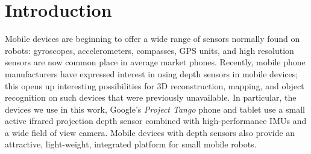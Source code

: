 \documentclass[conference,10pt]{IEEEtran}
\begin{document}
\section{Introduction}

Mobile devices are beginning to offer a wide range of sensors normally found on
robots: gyroscopes, accelerometers, compasses, GPS units, and high resolution
sensors are now common place in average market phones. Recently, mobile phone
manufacturers have expressed interest in using depth sensors in mobile devices;
this opens up interesting possibilities for 3D reconstruction, mapping,
and object recognition on such devices that were previously unavailable. In
particular, the devices we use in this work, Google's \textit{Project Tango} 
\cite{Tango} phone
and tablet use a small active ifrared projection depth sensor combined with
high-performance IMUs and a wide field of view camera. Mobile devices with depth
sensors also provide an attractive, light-weight, integrated platform for small mobile robots.
\end{document}
